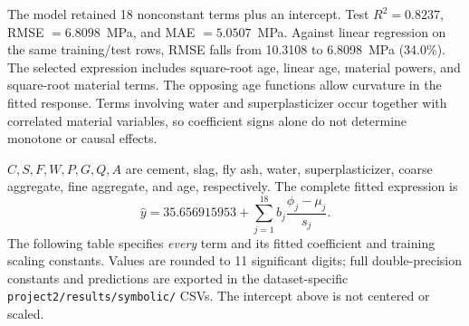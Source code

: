 \documentclass{article}
\begin{document}
The model retained 18 nonconstant terms plus an intercept. Test $R^2=0.8237$, RMSE $=6.8098$~MPa, and MAE $=5.0507$~MPa. Against linear regression on the same training/test rows, RMSE falls from 10.3108 to 6.8098~MPa (34.0\%). The selected expression includes square-root age, linear age, material powers, and square-root material terms. The opposing age functions allow curvature in the fitted response. Terms involving water and superplasticizer occur together with correlated material variables, so coefficient signs alone do not determine monotone or causal effects.

$C,S,F,W,P,G,Q,A$ are cement, slag, fly ash, water, superplasticizer, coarse aggregate, fine aggregate, and age, respectively.
The complete fitted expression is
\begin{equation}
\widehat{y}= 35.656915953 + \sum_{j=1}^{18} b_j\frac{\phi_j-\mu_j}{s_j}.
\end{equation}
The following table specifies \emph{every} term and its fitted coefficient and training scaling constants. Values are rounded to 11 significant digits; full double-precision constants and predictions are exported in the dataset-specific \texttt{project2/results/symbolic/} CSVs. The intercept above is not centered or scaled.
\end{document}
